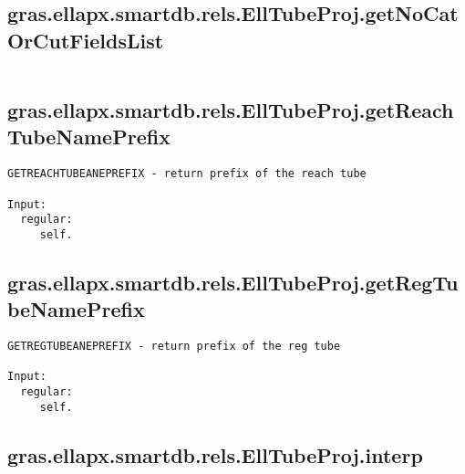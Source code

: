 \subsection{\texorpdfstring{gras.ellapx.smartdb.rels.EllTubeProj.getNoCatOrCutFieldsList}{getNoCatOrCutFieldsList}}\label{method:gras.ellapx.smartdb.rels.EllTubeProj.getNoCatOrCutFieldsList}
\begin{verbatim}

\end{verbatim}
\subsection{\texorpdfstring{gras.ellapx.smartdb.rels.EllTubeProj.getReachTubeNamePrefix}{getReachTubeNamePrefix}}\label{method:gras.ellapx.smartdb.rels.EllTubeProj.getReachTubeNamePrefix}
\begin{verbatim}
GETREACHTUBEANEPREFIX - return prefix of the reach tube

Input:
  regular:
     self.
\end{verbatim}
\subsection{\texorpdfstring{gras.ellapx.smartdb.rels.EllTubeProj.getRegTubeNamePrefix}{getRegTubeNamePrefix}}\label{method:gras.ellapx.smartdb.rels.EllTubeProj.getRegTubeNamePrefix}
\begin{verbatim}
GETREGTUBEANEPREFIX - return prefix of the reg tube

Input:
  regular:
     self.
\end{verbatim}
\subsection{\texorpdfstring{gras.ellapx.smartdb.rels.EllTubeProj.interp}{interp}}\label{method:gras.ellapx.smartdb.rels.EllTubeProj.interp}
\begin{verbatim}

\end{verbatim}
